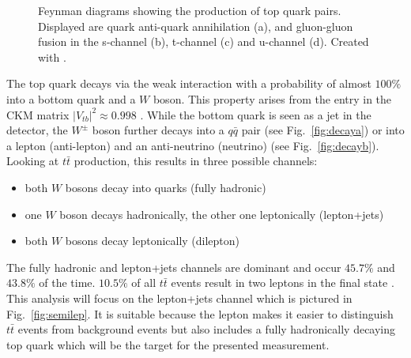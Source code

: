 \begin{figure}
\begin{subfigure}{.4\textwidth}
		\caption{}
		\label{fig:productionc}
		\end{subfigure}
		\begin{subfigure}{.4\textwidth}
		\caption{}
		\label{fig:productiond}
		\end{subfigure}
		\caption{Feynman diagrams showing the production of top quark pairs. Displayed are quark anti-quark annihilation (a), and gluon-gluon fusion in the s-channel (b), t-channel  (c) and u-channel (d). Created with \cite{feynman}.}
		\label{fig:production}
	\end{figure}	
	The top quark decays via the weak interaction with a probability of almost $100\%$ into a bottom quark and a $W$ boson. This property arises from the entry in the CKM matrix $|V_{tb}|^2 \approx 0.998$ \cite{pdg2016}. While the bottom quark is seen as a jet in the detector, the $W^\pm$ boson further decays into a $q\bar{q}$ pair (see Fig.~\ref{fig:decaya}) or into a lepton (anti-lepton) and an anti-neutrino (neutrino) (see Fig.~\ref{fig:decayb}). Looking at $t\bar{t}$ production, this results in three possible channels: 
	\begin{itemize}
	\item both $W$ bosons decay into quarks (fully hadronic)
	\item one $W$ boson decays hadronically, the other one leptonically (lepton+jets)
	\item both $W$ bosons decay leptonically (dilepton)
	\end{itemize}
	The fully hadronic and lepton+jets channels are dominant and occur $45.7\%$ and $43.8\%$ of the time. $10.5\%$ of all $t\bar{t}$ events result in two leptons in the final state \cite{pdg2016}. This analysis will focus on the lepton+jets channel which is pictured in Fig.~\ref{fig:semilep}. It is suitable because the lepton makes it easier to distinguish $t\bar{t}$ events from background events but also includes a fully hadronically decaying top quark which will be the target for the presented measurement.
	
